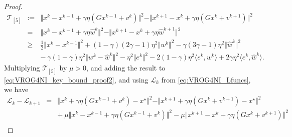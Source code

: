 \documentclass{article}
\newcommand{\norms}[1]{\Vert#1\Vert}
\newcommand{\iprods}[1]{\langle #1\rangle}
\newcommand{\Lc}{\mathcal{L}}
\newcommand{\Tc}{\mathcal{T}}
\theoremstyle{plain}
\theoremstyle{definition}
\theoremstyle{remark}
\begin{document}
\begin{proof}
\begin{equation*} 
\begin{array}{lcl}
\Tc_{[5]} &:= & \norms{x^k - x^{k-1} + \gamma \eta(Gx^{k-1} + v^k) }^2 - \norms{x^{k+1} - x^k + \gamma \eta(Gx^{k} + v^{k+1}) }^2 \\
& = & \norms{x^k - x^{k-1} + \gamma \eta \hat{w}^k }^2 - \norms{x^{k+1} - x^k + \gamma \eta\hat{w}^{k+1} }^2 \\ 
& \geq & \frac{1}{2} \norms{x^k - x^{k-1}}^2 + (1-\gamma)(2\gamma-1)\eta^2 \norms{w^k}^2 - \gamma(3\gamma-1)\eta^2\norms{\hat{w}^k}^2 \\
&& - {~} \gamma(1-\gamma)\eta^2 \norms{w^k - \hat{w}^k}^2 - \eta^2\norms{e^k}^2 - 2(1-\gamma)\eta^2\iprods{e^k, w^k} + 2\gamma\eta^2\iprods{e^k, \hat{w}^k}.
\end{array} 
\end{equation*}
Multiplying $\Tc_{[5]}$ by $\mu > 0$, and adding the result to \eqref{eq:VROG4NI_key_bound_proof2}, and using $\Lc_k$ from \eqref{eq:VROG4NI_Lfuncs}, we have
\begin{equation*} 
\begin{array}{lcl}
\Lc_k - \Lc_{k+1} & = &  \norms{x^k + \gamma\eta(Gx^{k-1} + v^k) - x^{\star}}^2 - \norms{x^{k+1} + \gamma \eta(Gx^k + v^{k+1}) - x^{\star}}^2 \\
&& + {~} \mu \norms{x^k - x^{k-1} + \gamma \eta(Gx^{k-1} + v^k) }^2 - \mu \norms{x^{k+1} - x^k + \gamma \eta(Gx^k + v^{k+1}) }^2 \\

\end{array}
\end{equation*}
\end{proof}
\end{document}

